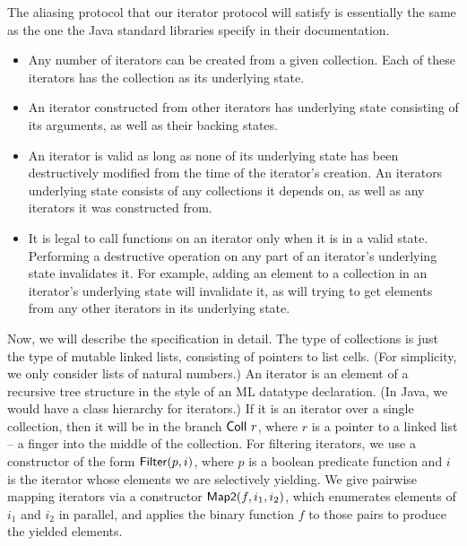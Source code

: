 \documentclass[preprint,natbib]{sigplanconf}
\begin{document}
The aliasing protocol that our iterator protocol will satisfy is
essentially the same as the one the Java standard libraries specify in
their documentation.

\begin{itemize}
\item Any number of iterators can be created from a given collection.
  Each of these iterators has the collection as its underlying state.

\item An iterator constructed from other iterators has underlying 
  state consisting of its arguments, as well as their backing states. 

\item An iterator is valid as long as none of its underlying state has
  been destructively modified from the time of the iterator's creation. An
  iterators underlying state consists of any collections it depends
  on, as well as any iterators it was constructed from.

\item It is legal to call functions on an iterator only when it 
  is in a valid state. Performing a destructive operation on any 
  part of an iterator's underlying state invalidates it. For example,
  adding an element to a collection in an iterator's underlying state
  will invalidate it, as will trying to get elements from any other 
  iterators in its underlying state. 
\end{itemize}


Now, we will describe the specification in detail. The type of
collections is just the type of mutable linked lists, consisting of
pointers to list cells. (For simplicity, we only consider lists of
natural numbers.) An iterator is an element of a recursive tree
structure in the style of an ML datatype declaration. (In Java, we
would have a class hierarchy for iterators.) If it is an iterator over
a single collection, then it will be in the branch $\mbox{\textsf{{Coll }}}r$,
where $r$ is a pointer to a linked list -- a finger into the middle of
the collection. For filtering iterators, we use a constructor of the
form $\mbox{\textsf{{Filter}}}(p, i)$, where $p$ is a boolean predicate function
and $i$ is the iterator whose elements we are selectively yielding. We
give pairwise mapping iterators via a constructor $\mbox{\textsf{{Map2}}}(f,
i_1, i_2)$, which enumerates elements of $i_1$ and $i_2$ in parallel,
and applies the binary function $f$ to those pairs to produce the
yielded elements.
\end{document}

